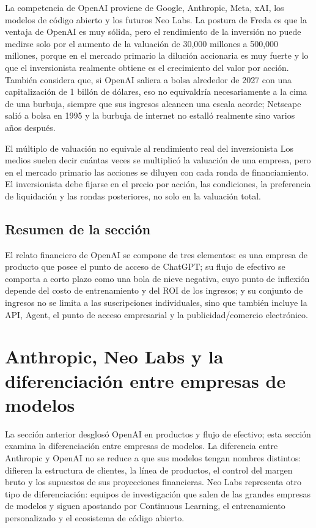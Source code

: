 \documentclass[a4paper]{article}
\begin{document}
La competencia de OpenAI proviene de Google, Anthropic, Meta, xAI, los modelos de código abierto y los futuros Neo Labs. La postura de Freda es que la ventaja de OpenAI es muy sólida, pero el rendimiento de la inversión no puede medirse solo por el aumento de la valuación de 30,000 millones a 500,000 millones, porque en el mercado primario la dilución accionaria es muy fuerte y lo que el inversionista realmente obtiene es el crecimiento del valor por acción. También considera que, si OpenAI saliera a bolsa alrededor de 2027 con una capitalización de 1 billón de dólares, eso no equivaldría necesariamente a la cima de una burbuja, siempre que sus ingresos alcancen una escala acorde; Netscape salió a bolsa en 1995 y la burbuja de internet no estalló realmente sino varios años después.

\begin{warningbox}{El múltiplo de valuación no equivale al rendimiento real del inversionista}
Los medios suelen decir cuántas veces se multiplicó la valuación de una empresa, pero en el mercado primario las acciones se diluyen con cada ronda de financiamiento. El inversionista debe fijarse en el precio por acción, las condiciones, la preferencia de liquidación y las rondas posteriores, no solo en la valuación total.
\end{warningbox}

\subsection{Resumen de la sección}

El relato financiero de OpenAI se compone de tres elementos: es una empresa de producto que posee el punto de acceso de ChatGPT; su flujo de efectivo se comporta a corto plazo como una bola de nieve negativa, cuyo punto de inflexión depende del costo de entrenamiento y del ROI de los ingresos; y su conjunto de ingresos no se limita a las suscripciones individuales, sino que también incluye la API, Agent, el punto de acceso empresarial y la publicidad/comercio electrónico.
\section{Anthropic, Neo Labs y la diferenciación entre empresas de modelos}

La sección anterior desglosó OpenAI en productos y flujo de efectivo; esta sección examina la diferenciación entre empresas de modelos. La diferencia entre Anthropic y OpenAI no se reduce a que sus modelos tengan nombres distintos: difieren la estructura de clientes, la línea de productos, el control del margen bruto y los supuestos de sus proyecciones financieras. Neo Labs representa otro tipo de diferenciación: equipos de investigación que salen de las grandes empresas de modelos y siguen apostando por Continuous Learning, el entrenamiento personalizado y el ecosistema de código abierto.
\end{document}
